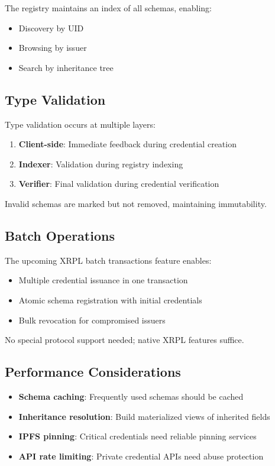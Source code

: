 \documentclass[11pt,a4paper]{article}
\begin{document}
The registry maintains an index of all schemas, enabling:
\begin{itemize}
    \item Discovery by UID
    \item Browsing by issuer
    \item Search by inheritance tree
\end{itemize}

\subsection{Type Validation}

Type validation occurs at multiple layers:
\begin{enumerate}
    \item \textbf{Client-side}: Immediate feedback during credential creation
    \item \textbf{Indexer}: Validation during registry indexing
    \item \textbf{Verifier}: Final validation during credential verification
\end{enumerate}

Invalid schemas are marked but not removed, maintaining immutability.

\subsection{Batch Operations}

The upcoming XRPL batch transactions feature enables:
\begin{itemize}
    \item Multiple credential issuance in one transaction
    \item Atomic schema registration with initial credentials
    \item Bulk revocation for compromised issuers
\end{itemize}

No special protocol support needed; native XRPL features suffice.

\subsection{Performance Considerations}

\begin{itemize}
    \item \textbf{Schema caching}: Frequently used schemas should be cached
    \item \textbf{Inheritance resolution}: Build materialized views of inherited fields
    \item \textbf{IPFS pinning}: Critical credentials need reliable pinning services
    \item \textbf{API rate limiting}: Private credential APIs need abuse protection
\end{itemize}
\end{document}
